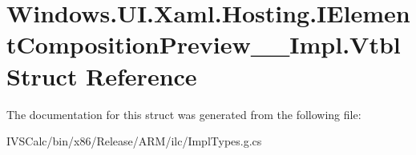 \hypertarget{struct_windows_1_1_u_i_1_1_xaml_1_1_hosting_1_1_i_element_composition_preview_____impl_1_1_vtbl}{}\section{Windows.\+U\+I.\+Xaml.\+Hosting.\+I\+Element\+Composition\+Preview\+\_\+\+\_\+\+Impl.\+Vtbl Struct Reference}
\label{struct_windows_1_1_u_i_1_1_xaml_1_1_hosting_1_1_i_element_composition_preview_____impl_1_1_vtbl}


The documentation for this struct was generated from the following file\+:\begin{DoxyCompactItemize}
\item 
I\+V\+S\+Calc/bin/x86/\+Release/\+A\+R\+M/ilc/Impl\+Types.\+g.\+cs\end{DoxyCompactItemize}
